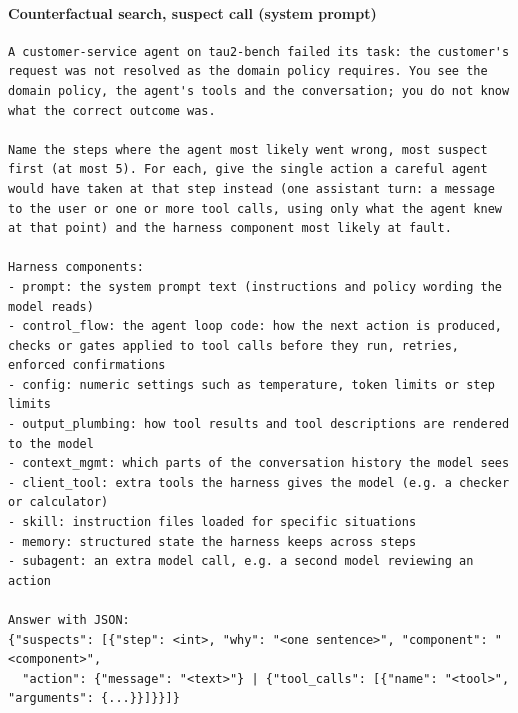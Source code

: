 \paragraph{Counterfactual search, suspect call (system prompt)}
\begin{Verbatim}[fontsize=\scriptsize, breaklines, breakanywhere]
A customer-service agent on tau2-bench failed its task: the customer's request was not resolved as the domain policy requires. You see the domain policy, the agent's tools and the conversation; you do not know what the correct outcome was.

Name the steps where the agent most likely went wrong, most suspect first (at most 5). For each, give the single action a careful agent would have taken at that step instead (one assistant turn: a message to the user or one or more tool calls, using only what the agent knew at that point) and the harness component most likely at fault.

Harness components:
- prompt: the system prompt text (instructions and policy wording the model reads)
- control_flow: the agent loop code: how the next action is produced, checks or gates applied to tool calls before they run, retries, enforced confirmations
- config: numeric settings such as temperature, token limits or step limits
- output_plumbing: how tool results and tool descriptions are rendered to the model
- context_mgmt: which parts of the conversation history the model sees
- client_tool: extra tools the harness gives the model (e.g. a checker or calculator)
- skill: instruction files loaded for specific situations
- memory: structured state the harness keeps across steps
- subagent: an extra model call, e.g. a second model reviewing an action

Answer with JSON:
{"suspects": [{"step": <int>, "why": "<one sentence>", "component": "<component>",
  "action": {"message": "<text>"} | {"tool_calls": [{"name": "<tool>", "arguments": {...}}]}}]}
\end{Verbatim}

